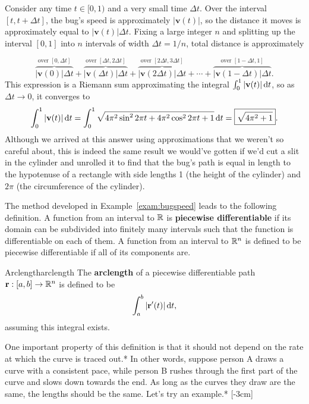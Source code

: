 \documentclass[prettycode,shellescape]{watsonbook}
\begin{document}
\begin{solution}
\begin{insetfigure}{\usebox{\asybox}}
    Consider any time $t \in [0,1)$ and a very small time $\Delta
    t$. Over the interval $[t,t+\Delta t]$, the bug's speed is
    approximately $|\mathbf{v}(t)|$, so the distance it moves is
    approximately equal to $|\mathbf{v}(t)|\Delta t$. Fixing a large
    integer $n$ and splitting up the interval $[0,1]$ into $n$ intervals
    of width $\Delta t = 1/n$, total distance is approximately
  \end{insetfigure}
  \[
    \overbrace{|\mathbf{v}(0)|\Delta t}^{\text{over }[0,\Delta t]}+
    \overbrace{|\mathbf{v}(\Delta t)|\Delta t}^{\text{over }[\Delta t,2\Delta t]} +
    \overbrace{|\mathbf{v}(2\Delta t)|\Delta t}^{\text{over }[2\Delta
      t,3\Delta t]}  + \cdots + 
    \overbrace{|\mathbf{v}(1-\Delta t)|\Delta t}^{\text{over
      }[1-\Delta t,1]}. 
  \]
  This expression is a Riemann sum approximating the integral
  $\int_0^1 |\mathbf{v}(t)| \, \mathrm{d} t$, so as $\Delta t \to 0$, it
  converges to 
  \[
    \int_0^1 |\mathbf{v}(t)| \, \mathrm{d} t = \int_0^1 \sqrt{4\pi^2\sin^2
      2\pi t + 4\pi^2 \cos^2 2 \pi t + 1} \, \mathrm{d} t =
    \boxed{\sqrt{4\pi^2 + 1}}. 
  \]
  Although we arrived at this answer using approximations that we
  weren't so careful about, this is indeed the same result we
  would've gotten if we'd cut a slit in the cylinder and unrolled it
  to find that the bug's path is equal in length to the hypotenuse of
  a rectangle with side lengths 1 (the height of the cylinder) and
  $2\pi$ (the circumference of the cylinder).
\end{solution}

The method developed in Example~\ref{exam:bugspeed} leads to the
following definition. A function from an interval to $\mathbb{R}$ is
\textbf{piecewise differentiable} if its domain can be subdivided into
finitely many intervals such that the function is differentiable on
each of them. A function from an interval to $\mathbb{R}^n$ is defined to be
piecewise differentiable if all of its components are.

\begin{defn}{Arclength}{arclength} 
  The \textbf{arclength} of a piecewise differentiable path
  $\mathbf{r}:[a,b] \to \mathbb{R}^n$ is defined to be
  \[
    \int_a^b |\mathbf{r}'(t)| \, \mathrm{d} t, 
  \]
  assuming this integral exists.
\end{defn}

One important property of this definition is that it should not depend
on the rate at which the curve is traced out.* In other words, suppose
person A draws a curve with a consistent pace, while person B rushes
through the first part of the curve and slows down towards the end. As
long as the curves they draw are the same, the lengths should be the
same. Let's try an example.* [-3cm] 
\end{document}
